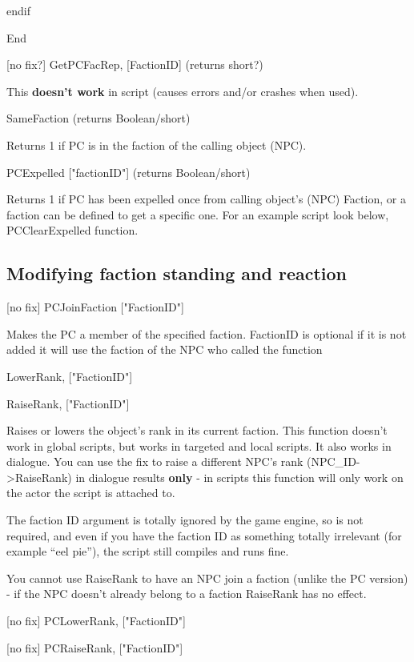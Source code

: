 \documentclass[
]{article}
\begin{document}
endif

End

{[}no fix?{]} GetPCFacRep, {[}FactionID{]} (returns short?)

This \textbf{doesn't work} in script (causes errors and/or crashes when
used).

SameFaction (returns Boolean/short)

Returns 1 if PC is in the faction of the calling object (NPC).

PCExpelled {[}"factionID"{]} (returns Boolean/short)

Returns 1 if PC has been expelled once from calling object's (NPC)
Faction, or a faction can be defined to get a specific one. For an
example script look below, PCClearExpelled function.

\hypertarget{modifying-faction-standing-and-reaction}{%
\subsection{Modifying faction standing and
reaction}\label{modifying-faction-standing-and-reaction}}

{[}no fix{]} PCJoinFaction {[}"FactionID"{]}

Makes the PC a member of the specified faction. FactionID is optional if
it is not added it will use the faction of the NPC who called the
function

LowerRank, {[}"FactionID"{]}

RaiseRank, {[}"FactionID"{]}

Raises or lowers the object's rank in its current faction. This function
doesn't work in global scripts, but works in targeted and local scripts.
It also works in dialogue. You can use the fix to raise a different
NPC's rank (NPC\_ID-\textgreater RaiseRank) in dialogue results
\textbf{only} - in scripts this function will only work on the actor the
script is attached to.

The faction ID argument is totally ignored by the game engine, so is not
required, and even if you have the faction ID as something totally
irrelevant (for example ``eel pie''), the script still compiles and runs
fine.

You cannot use RaiseRank to have an NPC join a faction (unlike the PC
version) - if the NPC doesn't already belong to a faction RaiseRank has
no effect.

{[}no fix{]} PCLowerRank, {[}"FactionID"{]}

{[}no fix{]} PCRaiseRank, {[}"FactionID"{]}
\end{document}
